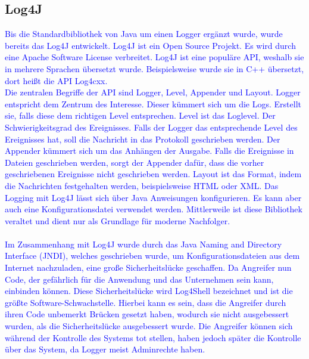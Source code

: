 \subsection{Log4J}\label{subsec:log4j}
\textcolor{blue}{
    Bis die Standardbibliothek von Java um einen Logger ergänzt wurde, wurde bereits das Log4J entwickelt.
    Log4J ist ein Open Source Projekt.
    Es wird durch eine Apache Software License verbreitet.
    Log4J ist eine populäre API, weshalb sie in mehrere Sprachen übersetzt wurde.
    Beispielsweise wurde sie in C++ übersetzt, dort heißt die API Log4cxx.
    \\
    Die zentralen Begriffe der API sind Logger, Level, Appender und Layout.
    Logger entspricht dem Zentrum des Interesse.
    Dieser kümmert sich um die Logs.
    Erstellt sie, falls diese dem richtigen Level entsprechen.
    Level ist das Loglevel.
    Der Schwierigkeitsgrad des Ereignisses.
    Falls der Logger das entsprechende Level des Ereignisses hat, soll die Nachricht in das Protokoll geschrieben werden.
    Der Appender kümmert sich um das Anhängen der Ausgabe.
    Falls die Ereignisse in Dateien geschrieben werden, sorgt der Appender dafür, dass die vorher geschriebenen Ereignisse nicht geschrieben werden.
    Layout ist das Format, indem die Nachrichten festgehalten werden, beispielsweise HTML oder XML.
    Das Logging mit Log4J lässt sich über Java Anweisungen konfigurieren.
    Es kann aber auch eine Konfigurationsdatei verwendet werden.
    Mittlerweile ist diese Bibliothek veraltet und dient nur als Grundlage für moderne Nachfolger.\autocite{baeldung, rheinwerk}
\\
\\
Im Zusammenhang mit Log4J wurde durch das Java Naming and Directory Interface (JNDI), welches geschrieben wurde, um Konfigurationsdateien aus dem Internet nachzuladen, eine große Sicherheitslücke geschaffen.
Da Angreifer nun Code, der gefährlich für die Anwendung und das Unternehmen sein kann, einbinden können.
Diese Sicherheitslücke wird Log4Shell bezeichnet und ist die größte Software-Schwachstelle.
Hierbei kann es sein, dass die Angreifer durch ihren Code unbemerkt Brücken gesetzt haben, wodurch sie nicht ausgebessert wurden, als die Sicherheitslücke ausgebessert wurde.
Die Angreifer können sich während der Kontrolle des Systems tot stellen, haben jedoch später die Kontrolle über das System, da Logger meist Adminrechte haben.}\autocite{heise}

